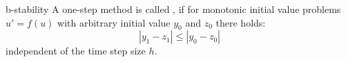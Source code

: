 \begin{Definition}{b-stability}
  A one-step method is called , if for monotonic
  initial value problems $u'=f(u)$ with arbitrary initial value $y_0$
  and $z_0$ there holds:
  \begin{equation}
    | y_1 - z_1 | \le | y_0 - z_0 |
  \end{equation}
  independent of the time step size $h$.
\end{Definition}
